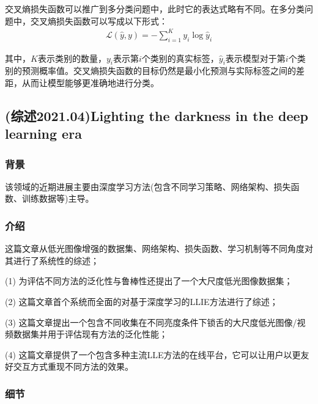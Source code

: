 \documentclass[letterpaper,12pt]{article}
\begin{document}
			交叉熵损失函数可以推广到多分类问题中，此时它的表达式略有不同。在多分类问题中，交叉熵损失函数可以写成以下形式： 
			\begin{equation}
				\begin{aligned}
					\mathcal{L}(\hat{y},y)=-\sum_{i=1}^K y_i \log \hat{y}_i
				\end{aligned}
				\label{eq: revised_Cross-entropy loss}
			\end{equation} 
			
			其中，$K$表示类别的数量，$y_i$表示第$i$个类别的真实标签，$\hat{y}_i$表示模型对于第$i$个类别的预测概率值。交叉熵损失函数的目标仍然是最小化预测与实际标签之间的差距，从而让模型能够更准确地进行分类。
			
	\subsection{(综述2021.04)Lighting the darkness in the deep learning era}
	
	\subsubsection{背景}
	
	该领域的近期进展主要由深度学习方法(包含不同学习策略、网络架构、损失函数、训练数据等)主导。
	
	\subsubsection{介绍}
	
	这篇文章从低光图像增强的数据集、网络架构、损失函数、学习机制等不同角度对其进行了系统性的综述；
	
	(1) 为评估不同方法的泛化性与鲁棒性还提出了一个大尺度低光图像数据集；
	
	(2) 这篇文章首个系统而全面的对基于深度学习的LLIE方法进行了综述；
	
	(3) 这篇文章提出一个包含不同收集在不同亮度条件下锁舌的大尺度低光图像/视频数据集并用于评估现有方法的泛化性能；
	
	(4) 这篇文章提供了一个包含多种主流LLE方法的在线平台，它可以让用户以更友好交互方式重现不同方法的效果。
	
	
	\subsubsection{细节}
	
	\renewcommand{\tablename}{Table}
	
	
\end{document}
